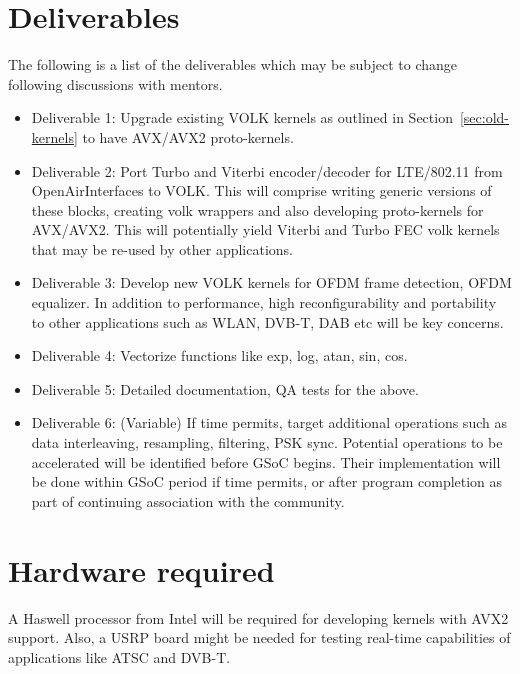 \documentclass[a4paper,12pt,oneside]{article}
\begin{document}
\section{Deliverables}
The following is a list of the deliverables which may be subject to change following discussions with mentors. 
\begin{itemize}
\item Deliverable 1: Upgrade existing VOLK kernels as outlined in Section~\ref{sec:old-kernels} to have AVX/AVX2 proto-kernels.
\item Deliverable 2: Port Turbo and Viterbi encoder/decoder for LTE/802.11 from OpenAirInterfaces to VOLK. This will comprise writing generic versions of these blocks, creating volk wrappers and also developing proto-kernels for AVX/AVX2. This will potentially yield Viterbi and Turbo FEC volk kernels that may be re-used by other applications.  
\item Deliverable 3: Develop new VOLK kernels for OFDM frame detection, OFDM equalizer. In addition to performance, high reconfigurability and portability to other applications such as WLAN, DVB-T, DAB etc will be key concerns.  
\item Deliverable 4: Vectorize functions like exp, log, atan, sin, cos.  
\item Deliverable 5: Detailed documentation, QA tests for the above. 
\item Deliverable 6: (Variable) If time permits, target additional operations such as data interleaving, resampling, filtering, PSK sync. Potential operations to be accelerated will be identified before GSoC begins. Their implementation will be done within GSoC period if time permits, or after program completion as part of continuing association with the community.
\end{itemize}

\section{Hardware required}

A Haswell processor from Intel will be required for developing kernels with AVX2 support. Also, a USRP board might be needed for testing real-time capabilities of applications like ATSC and DVB-T. 
\end{document}

